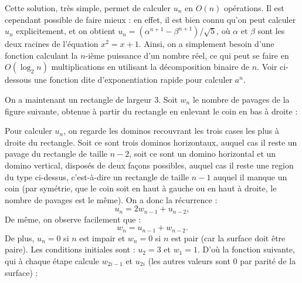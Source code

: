 Cette solution, très simple, permet de calculer $u_n$ en $O(n)$ opérations. Il est cependant possible de faire mieux : en effet, il est bien connu qu'on peut calculer $u_n$ explicitement, et on obtient $u_n=(\alpha^{n+1} - \beta^{n+1})/\sqrt{5}$, où $\alpha$ et $\beta$ sont les deux racines de l'équation $x^2=x+1$. Ainsi, on a simplement besoin d'une fonction calculant la $n$-ième puissance d'un nombre réel, ce qui peut se faire en $O(\log_2n)$ multiplications en utilisant la décomposition binaire de $n$. Voir ci-dessous une fonction dite \og d'exponentiation rapide \fg{} pour calculer $a^n$.



\Q
On a maintenant un rectangle de largeur 3. Soit $w_n$ le nombre de pavages de la figure suivante, obtenue à partir du rectangle en enlevant le coin en bas à droite :
\medskip


Pour calculer $u_n$, on regarde les dominos recouvrant les trois cases les plus à droite du rectangle. Soit ce sont trois dominos horizontaux, auquel cas il reste un pavage du rectangle de taille $n-2$, soit ce sont un domino horizontal et un domino vertical, disposés de deux façons possibles, auquel cas il reste une region du type ci-dessus, c'est-à-dire un rectangle de taille $n-1$ auquel il manque un coin (par symétrie, que le coin soit en haut à gauche ou en haut à droite, le nombre de pavages est le même). On a donc la récurrence :
\[
    u_n = 2w_{n-1} + u_{n-2},
\]
De même, on observe facilement que :
\[
    w_n = u_{n-1} + w_{n-2}.
\]
De plus, $u_n=0$ si $n$ est impair et $w_n=0$ si $n$ est pair (car la surface doit être paire). Les conditions initiales sont : $u_2=3$ et $w_1=1$. D'où la fonction suivante, qui à chaque étape calcule $w_{2i-1}$ et $u_{2i}$ (les autres valeurs sont 0 par parité de la surface) :

